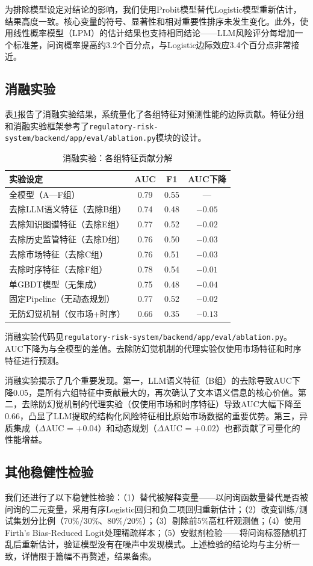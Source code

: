 为排除模型设定对结论的影响，我们使用Probit模型替代Logistic模型重新估计，结果高度一致。核心变量的符号、显著性和相对重要性排序未发生变化。此外，使用线性概率模型（LPM）的估计结果也支持相同结论——LLM风险评分每增加一个标准差，问询概率提高约3.2个百分点，与Logistic边际效应3.4个百分点非常接近。

\subsection{消融实验}

表\ref{tab:ablation}报告了消融实验结果，系统量化了各组特征对预测性能的边际贡献。特征分组和消融实验框架参考了\texttt{regulatory-risk-system/backend/app/eval/ablation.py}模块的设计。

\begin{table}[H]
\centering
\caption{消融实验：各组特征贡献分解}
\label{tab:ablation}
\begin{threeparttable}
\begin{tabular}{lccc}
\toprule
实验设定 & AUC & F1 & AUC下降 \\
\midrule
全模型（A—F组） & 0.79 & 0.55 & --- \\
去除LLM语义特征（去除B组） & 0.74 & 0.48 & $-0.05$ \\
去除知识图谱特征（去除E组） & 0.77 & 0.52 & $-0.02$ \\
去除历史监管特征（去除D组） & 0.76 & 0.50 & $-0.03$ \\
去除市场特征（去除C组） & 0.76 & 0.51 & $-0.03$ \\
去除时序特征（去除F组） & 0.78 & 0.54 & $-0.01$ \\
\midrule
单GBDT模型（无集成） & 0.75 & 0.48 & $-0.04$ \\
固定Pipeline（无动态规划） & 0.77 & 0.52 & $-0.02$ \\
无防幻觉机制（仅市场+时序） & 0.66 & 0.35 & $-0.13$ \\
\bottomrule
\end{tabular}
\begin{tablenotes}
\item[注] 消融实验代码见\texttt{regulatory-risk-system/backend/app/eval/ablation.py}。AUC下降为与全模型的差值。去除防幻觉机制的代理实验仅使用市场特征和时序特征进行预测。
\end{tablenotes}
\end{threeparttable}
\end{table}

消融实验揭示了几个重要发现。第一，LLM语义特征（B组）的去除导致AUC下降0.05，是所有六组特征中贡献最大的，再次确认了文本语义信息的核心价值。第二，去除防幻觉机制的代理实验（仅使用市场和时序特征）导致AUC大幅下降至0.66，凸显了LLM提取的结构化风险特征相比原始市场数据的重要优势。第三，异质集成（$\Delta$AUC = $+0.04$）和动态规划（$\Delta$AUC = $+0.02$）也都贡献了可量化的性能增益。

\subsection{其他稳健性检验}

我们还进行了以下稳健性检验：（1）替代被解释变量——以问询函数量替代是否被问询的二元变量，采用有序Logistic回归和负二项回归重新估计；（2）改变训练/测试集划分比例（70\%/30\%、80\%/20\%）；（3）剔除前5\%高杠杆观测值；（4）使用Firth's Bias-Reduced Logit处理稀疏样本；（5）安慰剂检验——将问询标签随机打乱后重新估计，验证模型没有在噪声中发现模式。上述检验的结论均与主分析一致，详情限于篇幅不再赘述，结果备索。